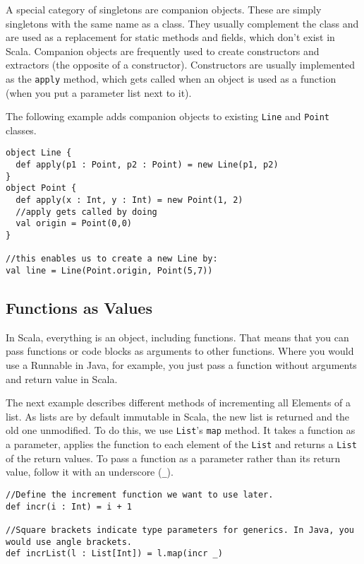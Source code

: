 A special category of singletons are companion objects. These are simply singletons with the same name as a class. They usually complement the class and are used as a replacement for static methods and fields, which don't exist in Scala. Companion objects are frequently used to create constructors and extractors (the opposite of a constructor). Constructors are usually implemented as the \lstinline!apply! method, which gets called when an object is used as a function (when you put a parameter list next to it).

The following example adds companion objects to existing \lstinline!Line! and \lstinline!Point! classes.

\begin{lstlisting}[caption=Scala Singletons and Companion Objects,label=lst:scala:singletons]
object Line {
  def apply(p1 : Point, p2 : Point) = new Line(p1, p2)
}
object Point {
  def apply(x : Int, y : Int) = new Point(1, 2)
  //apply gets called by doing
  val origin = Point(0,0)
}

//this enables us to create a new Line by:
val line = Line(Point.origin, Point(5,7))
\end{lstlisting}


\subsection{Functions as Values}

In Scala, everything is an object, including functions. That means that you can pass functions or code blocks as arguments to other functions. Where you would use a Runnable in Java, for example, you just pass a function without arguments and return value in Scala.

The next example describes different methods of incrementing all Elements of a list. As lists are by default immutable in Scala, the new list is returned and the old one unmodified. To do this, we use \lstinline!List!'s \lstinline!map! method. It takes a function as a parameter, applies the function to each element of the \lstinline!List! and returns a \lstinline!List! of the return values. To pass a function as a parameter rather than its return value, follow it with an underscore (\lstinline!_!).

\begin{lstlisting}[caption=Scala Function Parameters,label=lst:scala:functions1]
//Define the increment function we want to use later.
def incr(i : Int) = i + 1

//Square brackets indicate type parameters for generics. In Java, you would use angle brackets.
def incrList(l : List[Int]) = l.map(incr _)
\end{lstlisting}

